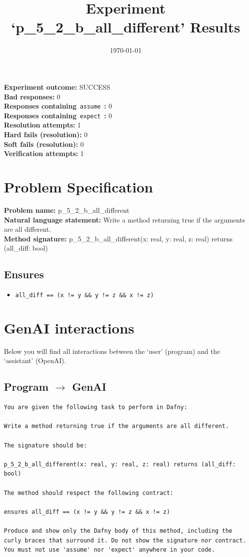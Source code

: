 \documentclass{article}
\begin{document}
\title{Experiment `p\_5\_2\_b\_all\_different' Results}
\author{\today}
\date{}
\maketitle
\textbf{Experiment outcome: }SUCCESS
\\\textbf{Bad responses: }0
\\\textbf{Responses containing}~\texttt{assume}~\textbf{: }0
\\\textbf{Responses containing}~\texttt{expect}~\textbf{: }0
\\\textbf{Resolution attempts: }1
\\\textbf{Hard fails (resolution): }0
\\\textbf{Soft fails (resolution): }0
\\\textbf{Verification attempts: }1
\section*{Problem Specification}
\textbf{Problem name: }p\_5\_2\_b\_all\_different
\\\textbf{Natural language statement: }Write a method returning true if the arguments are all different.
\\\textbf{Method signature: }p\_5\_2\_b\_all\_different(x: real, y: real, z: real) returns (all\_diff: bool)
\subsection*{Ensures}
\begin{itemize}
\item \texttt{all\_diff == (x != y \&\& y != z \&\& x != z)}
\end{itemize}
\clearpage
\section*{GenAI interactions}
Below you will find all interactions between the `user' (program) and the `assistant' (OpenAI).
\subsection*{Program $\rightarrow$ GenAI}
\begin{lstlisting}
You are given the following task to perform in Dafny:

Write a method returning true if the arguments are all different.

The signature should be:

p_5_2_b_all_different(x: real, y: real, z: real) returns (all_diff: bool)

The method should respect the following contract:

ensures all_diff == (x != y && y != z && x != z)

Produce and show only the Dafny body of this method, including the curly braces that surround it. Do not show the signature nor contract. You must not use 'assume' nor 'expect' anywhere in your code.
\end{lstlisting}
\end{document}
